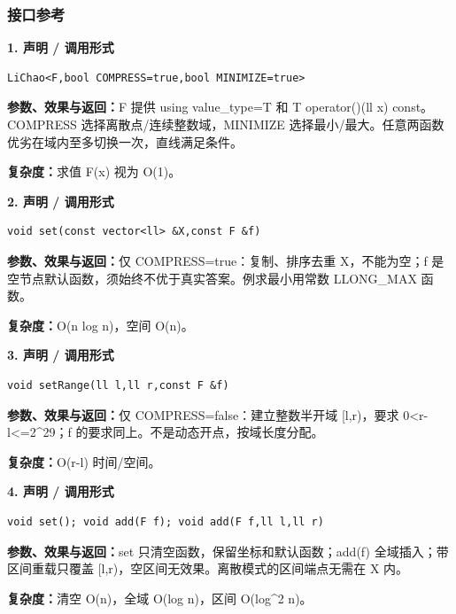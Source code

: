 \documentclass[UTF8,a4paper,10pt]{ctexart}
\begin{document}
\subsubsection*{接口参考}
\noindent\begin{minipage}{\textwidth}
\textbf{1. 声明 / 调用形式}
\begin{lstlisting}
LiChao<F,bool COMPRESS=true,bool MINIMIZE=true>
\end{lstlisting}
\textbf{参数、效果与返回：}F 提供 using value\_type=T 和 T operator()(ll x) const。COMPRESS 选择离散点/连续整数域，MINIMIZE 选择最小/最大。任意两函数优劣在域内至多切换一次，直线满足条件。

\textbf{复杂度：}求值 F(x) 视为 O(1)。

\end{minipage}\par\vspace{0.4em}
\noindent\begin{minipage}{\textwidth}
\textbf{2. 声明 / 调用形式}
\begin{lstlisting}
void set(const vector<ll> &X,const F &f)
\end{lstlisting}
\textbf{参数、效果与返回：}仅 COMPRESS=true：复制、排序去重 X，不能为空；f 是空节点默认函数，须始终不优于真实答案。例求最小用常数 LLONG\_MAX 函数。

\textbf{复杂度：}O(n log n)，空间 O(n)。

\end{minipage}\par\vspace{0.4em}
\noindent\begin{minipage}{\textwidth}
\textbf{3. 声明 / 调用形式}
\begin{lstlisting}
void setRange(ll l,ll r,const F &f)
\end{lstlisting}
\textbf{参数、效果与返回：}仅 COMPRESS=false：建立整数半开域 [l,r)，要求 0<r-l<=2\textasciicircum{}29；f 的要求同上。不是动态开点，按域长度分配。

\textbf{复杂度：}O(r-l) 时间/空间。

\end{minipage}\par\vspace{0.4em}
\noindent\begin{minipage}{\textwidth}
\textbf{4. 声明 / 调用形式}
\begin{lstlisting}
void set(); void add(F f); void add(F f,ll l,ll r)
\end{lstlisting}
\textbf{参数、效果与返回：}set 只清空函数，保留坐标和默认函数；add(f) 全域插入；带区间重载只覆盖 [l,r)，空区间无效果。离散模式的区间端点无需在 X 内。

\textbf{复杂度：}清空 O(n)，全域 O(log n)，区间 O(log\textasciicircum{}2 n)。

\end{minipage}\par\vspace{0.4em}
\end{document}
